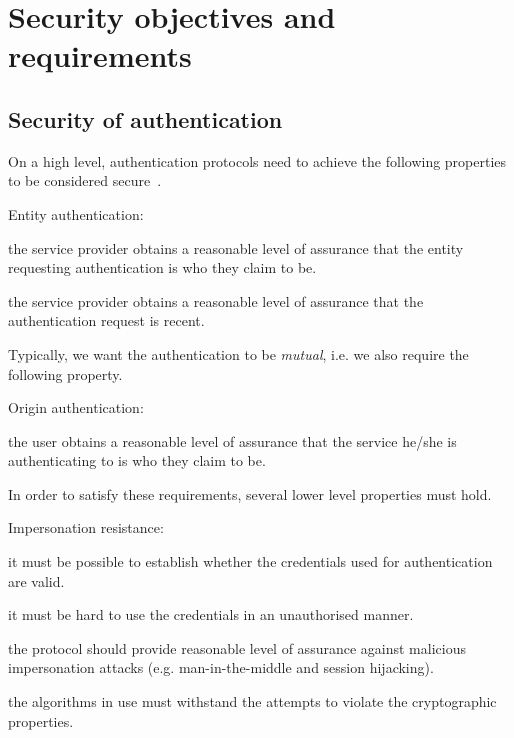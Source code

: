 \section{Security objectives and requirements}

\subsection{Security of authentication}

On a high level, authentication protocols need to achieve the following properties to be considered secure~\cite{BoMa10}.

\begin{labeling}{Entity authentication:}
    \item[Entity authentication:] the service provider obtains a reasonable level of assurance that the entity requesting authentication is who they claim to be.
    \item[Freshness:] the service provider obtains a reasonable level of assurance that the authentication request is recent.
\end{labeling}

Typically, we want the authentication to be \emph{mutual}, i.e. we also require the following property.

\begin{labeling}{Origin authentication:}
    \item[Origin authentication:] the user obtains a reasonable level of assurance that the service he/she is authenticating to is who they claim to be.
\end{labeling}

In order to satisfy these requirements, several lower level properties must hold.

\begin{labeling}{Impersonation resistance:}
    \item[Credential validity:] it must be possible to establish whether the credentials used for authentication are valid.
    \item[Authorised usage:] it must be hard to use the credentials in an unauthorised manner.
    \item[Impersonation resistance:] the protocol should provide reasonable level of assurance against malicious impersonation attacks (e.g. man-in-the-middle and session hijacking). 
    \item[Cryptographic strength:] the algorithms in use must withstand the attempts to violate the cryptographic properties. 
\end{labeling}

